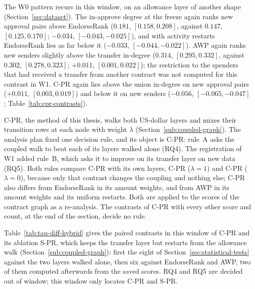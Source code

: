 The W0 pattern recurs in this window, on an allowance layer of another shape (Section~\ref{sec:dataset}). The in-approve degree at the freeze again ranks new approval pairs above EndorseRank ($0.181$, $[0.158,0.208]$, against $0.147$, $[0.125,0.170]$; $-0.034$, $[-0.043,-0.025]$), and with activity restarts EndorseRank lies as far below it ($-0.033$, $[-0.044,-0.022]$). AWP again ranks new senders slightly above the transfer in-degree ($0.314$, $[0.295,0.332]$, against $0.302$, $[0.278,0.323]$; $+0.011$, $[0.001,0.022]$); the restriction to the spenders that had received a transfer from another contract was not computed for this contrast in W1. \mbox{C-PR} again lies above the union in-degree on new approval pairs ($+0.011$, $[0.003,0.019]$) and below it on new senders ($-0.056$, $[-0.065,-0.047]$; Table~\ref{tab:cpr-contrasts}).




\mbox{C-PR}, the method of this thesis, walks both US-dollar layers and mixes their transition rows at each node with weight $\lambda$ (Section~\ref{sub:coupled-graph}). The analysis plan fixed one decision rule, and its object is \mbox{C-PR}: rule~A asks the coupled walk to beat each of its layers walked alone (RQ4). The registration of W1 added rule~B, which asks it to improve on its transfer layer on new data (RQ5). Both rules compare \mbox{C-PR} with its own layers, \mbox{C-PR} ($\lambda=1$) and \mbox{C-PR} ($\lambda=0$), because only that contrast changes the coupling and nothing else; \mbox{C-PR} also differs from EndorseRank in its amount weights, and from AWP in its amount weights and its uniform restarts. Both are applied to the scores of the contract graph as a re-analysis. The contrasts of \mbox{C-PR} with every other score and count, at the end of the section, decide no rule.


Table~\ref{tab:tau-diff-hybrid} gives the paired contrasts in this window of \mbox{C-PR} and its ablation \mbox{S-PR}, which keeps the transfer layer but restarts from the allowance walk (Section~\ref{sub:coupled-graph}): first the eight of Section~\ref{sec:statistical-tests} against the two layers walked alone, then six against EndorseRank and AWP, two of them computed afterwards from the saved scores. RQ4 and RQ5 are decided out of window; this window only locates \mbox{C-PR} and \mbox{S-PR}.

